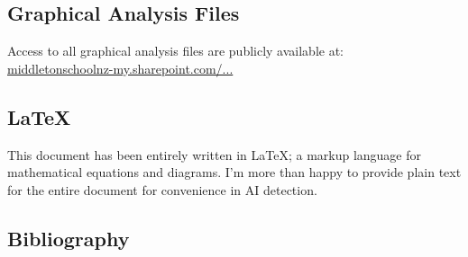 \documentclass[11pt, a4paper]{article}
\begin{document}
	\subsection{Graphical Analysis Files}
	Access to all graphical analysis files are publicly available at:\\
	\href{https://middletonschoolnz-my.sharepoint.com/:f:/g/personal/taskern_middleton_school_nz/EhEmw21C2L9Fn9BYUy2ccwMBn6xCUF93vtfvtT_5_rkxbA?e=Tp02lP}{middletonschoolnz-my.sharepoint.com/...}
	\subsection{\LaTeX}
	This document has been entirely written in \LaTeX; a markup language for mathematical equations and diagrams. I'm more than happy to provide plain text for the entire document for convenience in AI detection.
	\subsection{Bibliography}
\end{document}
